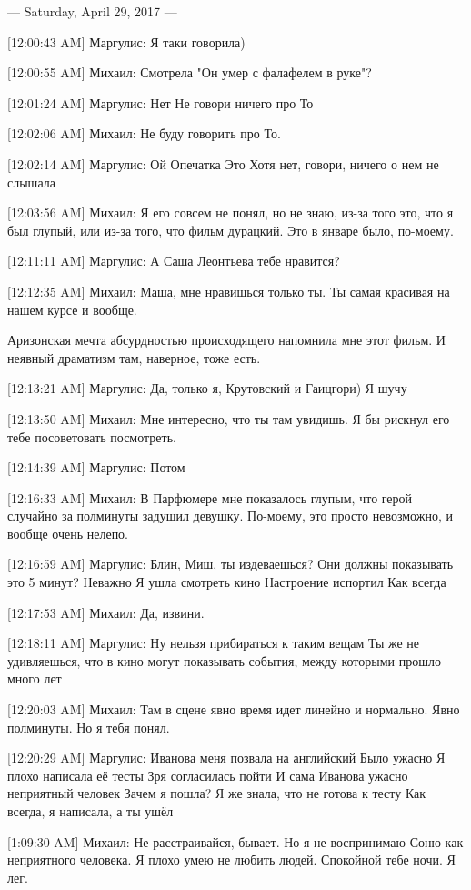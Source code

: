 \documentclass{article}
\begin{document}
--- Saturday, April 29, 2017 ---

[12:00:43 AM] Маргулис:
Я таки говорила)

[12:00:55 AM] Михаил:
Смотрела "Он умер с фалафелем в руке"?

[12:01:24 AM] Маргулис:
Нет
 Не говори ничего про 
То

[12:02:06 AM] Михаил:
Не буду говорить про То.

[12:02:14 AM] Маргулис:
Ой
 Опечатка
 Это
 Хотя нет, говори, ничего о нем не слышала

[12:03:56 AM] Михаил:
Я его совсем не понял, но не знаю, из-за того это, что я был глупый, или из-за того, что фильм дурацкий.
 Это в январе было, по-моему.

[12:11:11 AM] Маргулис:
А Саша Леонтьева тебе нравится?

[12:12:35 AM] Михаил:
Маша, мне нравишься только ты. Ты самая красивая на нашем курсе и вообще.

Аризонская мечта абсурдностью происходящего напомнила мне этот фильм. И неявный драматизм там, наверное, тоже есть.

[12:13:21 AM] Маргулис:
Да, только я, Крутовский и Гаицгори)
 Я шучу

[12:13:50 AM] Михаил:
Мне интересно, что ты там увидишь. Я бы рискнул его тебе посоветовать посмотреть.

[12:14:39 AM] Маргулис:
Потом

[12:16:33 AM] Михаил:
В Парфюмере мне показалось глупым, что герой случайно за полминуты задушил девушку. По-моему, это просто невозможно, и вообще очень нелепо.

[12:16:59 AM] Маргулис:
Блин, Миш, ты издеваешься?
 Они должны показывать это 5 минут?
 Неважно
 Я ушла смотреть кино
 Настроение испортил
 Как всегда

[12:17:53 AM] Михаил:
Да, извини.

[12:18:11 AM] Маргулис:
Ну нельзя прибираться к таким вещам
 Ты же не удивляешься, что в кино могут показывать события, между которыми прошло много лет

[12:20:03 AM] Михаил:
Там в сцене явно время идет линейно и нормально. Явно полминуты. Но я тебя понял.

[12:20:29 AM] Маргулис:
Иванова меня позвала на английский
 Было ужасно
 Я плохо написала её тесты
 Зря согласилась пойти
 И сама Иванова ужасно неприятный человек
 Зачем я пошла? Я же знала, что не готова к тесту
 Как всегда, я написала, а ты ушёл

[1:09:30 AM] Михаил:
Не расстраивайся, бывает. Но я не воспринимаю Соню как неприятного человека. Я плохо умею не любить людей.
 Спокойной тебе ночи. Я лег.
\end{document}
